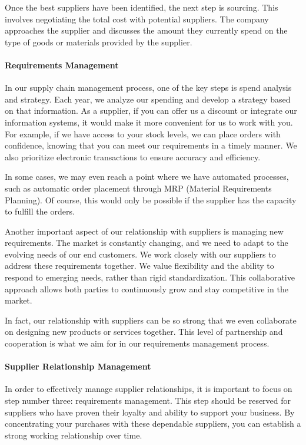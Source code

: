 Once the best suppliers have been identified, the next step is sourcing.
This involves negotiating the total cost with potential suppliers. The
company approaches the supplier and discusses the amount they currently
spend on the type of goods or materials provided by the supplier.

\paragraph{Requirements Management}\label{requirements-management}

In our supply chain management process, one of the key steps is spend
analysis and strategy. Each year, we analyze our spending and develop a
strategy based on that information. As a supplier, if you can offer us a
discount or integrate our information systems, it would make it more
convenient for us to work with you. For example, if we have access to
your stock levels, we can place orders with confidence, knowing that you
can meet our requirements in a timely manner. We also prioritize
electronic transactions to ensure accuracy and efficiency.

In some cases, we may even reach a point where we have automated
processes, such as automatic order placement through MRP (Material
Requirements Planning). Of course, this would only be possible if the
supplier has the capacity to fulfill the orders.

Another important aspect of our relationship with suppliers is managing
new requirements. The market is constantly changing, and we need to
adapt to the evolving needs of our end customers. We work closely with
our suppliers to address these requirements together. We value
flexibility and the ability to respond to emerging needs, rather than
rigid standardization. This collaborative approach allows both parties
to continuously grow and stay competitive in the market.

In fact, our relationship with suppliers can be so strong that we even
collaborate on designing new products or services together. This level
of partnership and cooperation is what we aim for in our requirements
management process.

\paragraph{Supplier Relationship
  Management}\label{supplier-relationship-management}

In order to effectively manage supplier relationships, it is important
to focus on step number three: requirements management. This step should
be reserved for suppliers who have proven their loyalty and ability to
support your business. By concentrating your purchases with these
dependable suppliers, you can establish a strong working relationship
over time.

